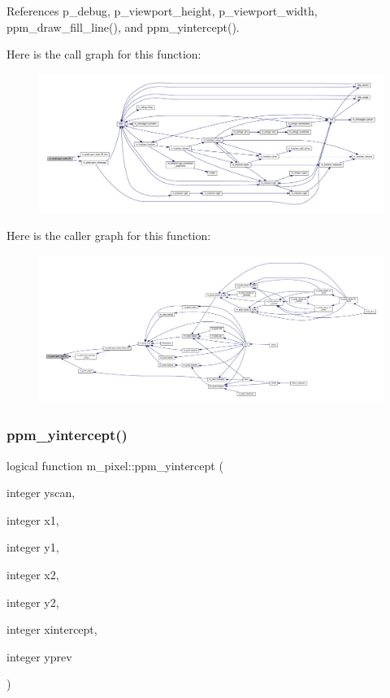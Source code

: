 References p\+\_\+debug, p\+\_\+viewport\+\_\+height, p\+\_\+viewport\+\_\+width, ppm\+\_\+draw\+\_\+fill\+\_\+line(), and ppm\+\_\+yintercept().

Here is the call graph for this function\+:
\nopagebreak
\begin{figure}[H]
\begin{center}
\leavevmode
\includegraphics[width=350pt]{namespacem__pixel_aedaf33a27e9899da22c2497aff2af903_cgraph}
\end{center}
\end{figure}
Here is the caller graph for this function\+:
\nopagebreak
\begin{figure}[H]
\begin{center}
\leavevmode
\includegraphics[width=350pt]{namespacem__pixel_aedaf33a27e9899da22c2497aff2af903_icgraph}
\end{center}
\end{figure}
\mbox{\label{namespacem__pixel_a4924b3a5033acb74a4f4df60a4ba21eb}} 
\subsubsection{\texorpdfstring{ppm\+\_\+yintercept()}{ppm\_yintercept()}}
{\footnotesize\ttfamily logical function m\+\_\+pixel\+::ppm\+\_\+yintercept (\begin{DoxyParamCaption}\item[{integer}]{yscan,  }\item[{integer}]{x1,  }\item[{integer}]{y1,  }\item[{integer}]{x2,  }\item[{integer}]{y2,  }\item[{integer}]{xintercept,  }\item[{integer}]{yprev }\end{DoxyParamCaption})\hspace{0.3cm}{\ttfamily [private]}}



